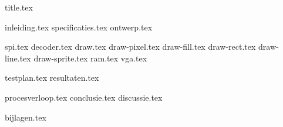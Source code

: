 \documentclass[final]{scrreprt}
\begin{document}

{title.tex}

\newpage

\tableofcontents

\newpage
{}
{inleiding.tex}
{specificaties.tex}
{ontwerp.tex}

{spi.tex}
{decoder.tex}
{draw.tex}
{draw-pixel.tex}
{draw-fill.tex}
{draw-rect.tex}
{draw-line.tex}
{draw-sprite.tex}
{ram.tex}
{vga.tex}

{testplan.tex}
{resultaten.tex}

{procesverloop.tex}
{conclusie.tex}
{discussie.tex}

\newpage
{}

\printbibliography
{bijlagen.tex}
\end{document}
